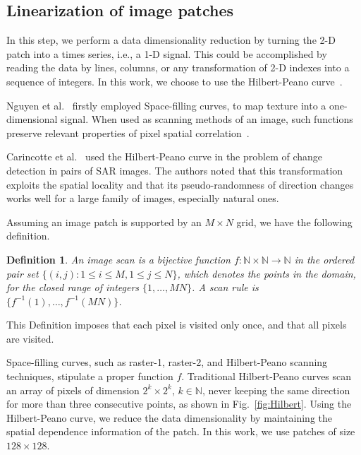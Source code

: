 \documentclass[journal]{IEEEtran}
\begin{document}
\subsection{Linearization of image patches}\label{linearization}

In this step, we perform a data dimensionality reduction by turning the 2-D patch into a times series, i.e., a 1-D signal.
This could be accomplished by reading the data by lines, columns, or any transformation of 2-D indexes into a sequence of integers.
In this work, we choose to use the Hilbert-Peano curve~\cite{Lee1994Texture}.

Nguyen et al.~\cite{nguyen1982space} firstly employed Space-filling curves, to map texture into a one-dimensional signal.
When used as scanning methods of an image, such functions preserve relevant properties of pixel spatial correlation~\cite{Lee1994Texture}.

Carincotte et al.~\cite{Carincotte2006changeDetection} used the Hilbert-Peano curve in the problem of change detection in pairs of SAR images.
The authors noted that this transformation exploits the spatial locality and that its pseudo-randomness
of direction changes works well for a large family of images, especially
natural ones.

Assuming an image patch is supported by an $M \times N$ grid, we have the following definition.

\newtheorem{mydef}{Definition}
\begin{mydef}
	An image scan is a bijective function $f \colon \mathbb{N} \times \mathbb{N} \to \mathbb{N}$ in the ordered pair set $ \{(i, j): 1 \leq i \leq M , 1 \leq j \leq N\}$, which denotes the points in the domain, for the closed range of integers $\{1, \dots, M  N\}$.
	A scan rule is $\{f^{-1}(1), \dots, f^{-1}(M  N)\}$.
	\label{def:CurveFilling}
\end{mydef}
This Definition imposes that each pixel is visited only once, and that all pixels are visited.

Space-filling curves, such as raster-1, raster-2, and Hilbert-Peano scanning techniques, stipulate a proper function $f$.
Traditional Hilbert-Peano curves scan an array of pixels of dimension $2^k \times 2^k$, $k \in \mathbb{N}$, never keeping the same direction for more than three consecutive points, as shown in Fig.~\ref{fig:Hilbert}.
Using the Hilbert-Peano curve, we reduce the data dimensionality by maintaining the spatial dependence information of the patch.
In this work, we use patches of size $128 \times 128$.
\end{document}
